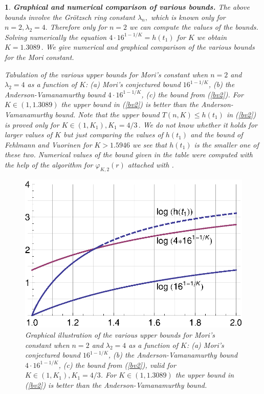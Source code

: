 \documentclass[12pt,a4paper,leqno]{amsart}
\theoremstyle{plain}
\newtheorem{subsec}[equation]{}
\numberwithin{equation}{section}          %
\begin{document}
\begin{subsec}{\bf Graphical and numerical comparison of various bounds.}
{\rm The above bounds involve the Gr\"otzsch ring constant $\lambda_n,$ which is known only for $n=2, \lambda_2=4.$
Therefore only for $n=2$ we can compute the values of the bounds.
Solving numerically the equation ${4\cdot16}^{1-1/K}=h(t_1) $
for $K$ we obtain $K=1.3089\,.$ We give numerical and graphical
comparison of the various bounds for the Mori constant. }

{\rm Tabulation of the various upper bounds for Mori's constant when
$n=2$ and $\lambda_2=4$ as a function of $K$: (a) Mori's conjectured
bound $16^{1-1/K}$, (b) the Anderson-Vamanamurthy bound $4 \cdot
16^{1-1/K}$, (c) the bound from (\ref{bv2}). For $K\in (1, 1.3089)$
the upper bound in (\ref{bv2}) is better than the
Anderson-Vamanamurthy bound. Note that the upper bound $T(n,K)\le h(t_1)$ in
(\ref{bv2}) is proved only for $K \in (1,K_1), K_1= 4/3\,.$
We do not know whether it holds for larger values of $K$ but just comparing
the values of $h(t_1)$ and the bound of Fehlmann and Vuorinen for
 $K >1.5946$ we see that $h(t_1)$ is the smaller one of these two.
Numerical values of the \cite{fv} bound given in the table were
computed with the help of the algorithm for $\varphi_{K,2}(r)$
attached with {\cite[p. 92, 439]{avvb}}}.


\begin{figure}
\includegraphics[width=12cm]{hgnew.eps}
\caption{Graphical illustration of the various upper bounds for Mori's constant when $n=2$
and $\lambda_2=4$ as a function of $K$:
(a) Mori's conjectured bound $16^{1-1/K}$, (b) the Anderson-Vamanamurthy bound $4 \cdot 16^{1-1/K}$,
(c) the bound from (\ref{bv2}),  valid for $K\in(1,K_1), K_1=4/3$. For $K\in (1, 1.3089)$ the upper bound in (\ref{bv2}) is better
than the Anderson-Vamanamurthy bound.}
\end{figure}



\end{subsec}
\end{document}
